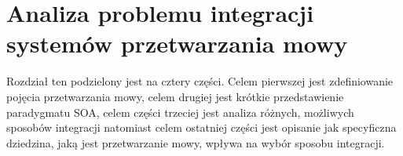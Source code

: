 
\chapter{Analiza problemu integracji systemów przetwarzania mowy} %



\ifpdf
    \graphicspath{{2/figures/PNG/}{2/figures/PDF/}{2/figures/}}
\else
    \graphicspath{{2/figures/EPS/}{2/figures/}}
\fi


Rozdział ten podzielony jest na cztery części. Celem pierwszej jest zdefiniowanie pojęcia przetwarzania mowy, celem drugiej jest krótkie przedstawienie paradygmatu SOA, celem części trzeciej jest analiza różnych, możliwych sposobów integracji natomiast celem ostatniej części jest opisanie jak specyficzna dziedzina, jaką jest przetwarzanie mowy, wpływa na wybór sposobu integracji.

